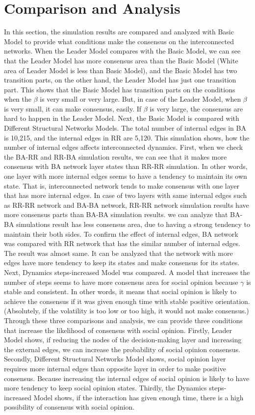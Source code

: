 \documentclass[english]{cccconf}
\begin{document}
\section{Comparison and Analysis}
In this section, the simulation results are compared and analyzed with Basic Model to provide what conditions make the consensus on the interconnected networks. When the Leader Model compares with the Basic Model, we can see that the Leader Model has more consensus area than the Basic Model (White area of Leader Model is less than Basic Model), and the Basic Model has two transition parts, on the other hand, the Leader Model has just one transition part. This shows that the Basic Model has transition parts on the conditions when the $\beta$ is very small or very large. But, in case of the Leader Model, when $\beta$ is very small, it can make consensus, easily. If $\beta$ is very large, the consensus are hard to happen in the Leader Model.
Next, the Basic Model is compared with Different Structural Networks Models. The total number of internal edges in BA is 10,215, and the internal edges in RR are 5,120. This simulation shows, how the number of internal edges affects interconnected dynamics. First, when we check the BA-RR and RR-BA simulation results, we can see that it makes more consensus with BA network layer states than RR-RR simulation. In other words, one layer with more internal edges seems to have a tendency to maintain its own state. That is, interconnected network tends to make consensus with one layer that has more internal edges. In case of two layers with same internal edges such as RR-RR network and BA-BA network, RR-RR network simulation results have more consensus parts than BA-BA simulation results. we can analyze that BA-BA simulations result has less consensus area, due to having a strong tendency to maintain their both sides. To confirm the effect of internal edges, BA network was compared with RR network that has the similar number of internal edges. The result was almost same. It can be analyzed that the network with more edges have more tendency to keep its states and make consensus for its states.
Next, Dynamics steps-increased Model was compared. A model that increases the number of steps seems to have more consensus area for social opinion because $\gamma$ is stable and consistent. In other words, it means that social opinion is likely to achieve the consensus if it was given enough time with stable positive orientation.(Absolutely, if the volatility is too low or too high, it would not make consensus.) \\ 
Through these three comparisons and analysis, we can provide three conditions that increase the likelihood of consensus with social opinion. Firstly, Leader Model shows, if reducing the nodes of the decision-making layer and increasing the external edges, we can increase the probability of social opinion consensus. Secondly, Different Structural Networks Model shows, social opinion layer requires more internal edges than opposite layer in order to make positive consensus. Because increasing the internal edges of social opinion is likely to have more tendency to keep social opinion states. Thirdly, the Dynamics steps-increased Model shows, if the interaction has given enough time, there is a high possibility of consensus with social opinion.
\end{document}
